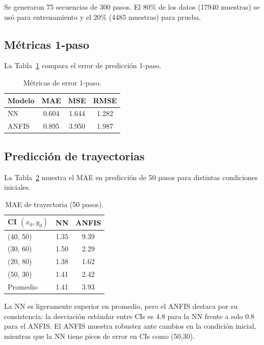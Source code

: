 \documentclass[twocolumn]{article}
\begin{document}
Se generaron 75 secuencias de 300 pasos. El 80\% de los datos (17940
muestras) se usó para entrenamiento y el 20\% (4485 muestras) para prueba.

\subsection{Métricas 1-paso}

La Tabla~\ref{tab:metricas} compara el error de predicción 1-paso.

\begin{table}[h]
\centering
\caption{Métricas de error 1-paso.}
\label{tab:metricas}
\begin{tabular}{lccc}
\toprule
\textbf{Modelo} & \textbf{MAE} & \textbf{MSE} & \textbf{RMSE} \\
\midrule
NN    & 0.604 & 1.644 & 1.282 \\
ANFIS & 0.895 & 3.950 & 1.987 \\
\bottomrule
\end{tabular}
\end{table}

\subsection{Predicción de trayectorias}

La Tabla~\ref{tab:tray} muestra el MAE en predicción de 50 pasos para
distintas condiciones iniciales.

\begin{table}[h]
\centering
\caption{MAE de trayectoria (50 pasos).}
\label{tab:tray}
\begin{tabular}{lcc}
\toprule
\textbf{CI $(x_0,y_0)$} & \textbf{NN} & \textbf{ANFIS} \\
\midrule
(40, 50) & 1.35 & 9.39 \\
(30, 60) & 1.50 & 2.29 \\
(20, 80) & 1.38 & 1.62 \\
(50, 30) & 1.41 & 2.42 \\
\midrule
Promedio  & 1.41 & 3.93 \\
\bottomrule
\end{tabular}
\end{table}

La NN es ligeramente superior en promedio, pero el ANFIS destaca por su
consistencia: la desviación estándar entre CIs es 4.8 para la NN frente
a solo 0.8 para el ANFIS. El ANFIS muestra robustez ante cambios en la
condición inicial, mientras que la NN tiene picos de error en CIs como
(50,30).
\end{document}
